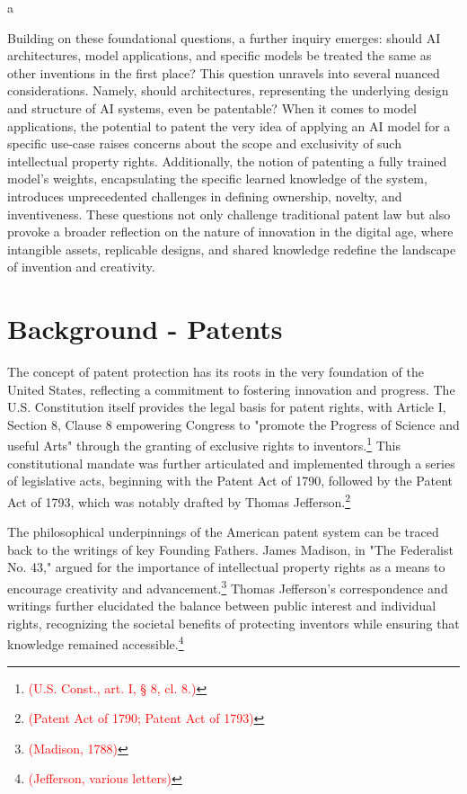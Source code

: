 a\documentclass{article}[10pt]
\begin{document}
Building on these foundational questions, a further inquiry emerges: should AI architectures, model applications, and specific models be treated the same as other inventions in the first place? 
This question unravels into several nuanced considerations. 
Namely, should architectures, representing the underlying design and structure of AI systems, even be patentable? 
When it comes to model applications, the potential to patent the very idea of applying an AI model for a specific use-case raises concerns about the scope and exclusivity of such intellectual property rights. 
Additionally, the notion of patenting a fully trained model's weights, encapsulating the specific learned knowledge of the system, introduces unprecedented challenges in defining ownership, novelty, and inventiveness. 
These questions not only challenge traditional patent law but also provoke a broader reflection on the nature of innovation in the digital age, where intangible assets, replicable designs, and shared knowledge redefine the landscape of invention and creativity.

\section{Background - Patents}

The concept of patent protection has its roots in the very foundation of the United States, reflecting a commitment to fostering innovation and progress. 
The U.S. Constitution itself provides the legal basis for patent rights, with Article I, Section 8, Clause 8 empowering Congress to "promote the Progress of Science and useful Arts" through the granting of exclusive rights to inventors.\footnote{
    \textcolor{red}{(U.S. Const., art. I, § 8, cl. 8.)}} 
This constitutional mandate was further articulated and implemented through a series of legislative acts, beginning with the Patent Act of 1790, followed by the Patent Act of 1793, which was notably drafted by Thomas Jefferson.\footnote{
    \textcolor{red}{(Patent Act of 1790; Patent Act of 1793)}}\par

The philosophical underpinnings of the American patent system can be traced back to the writings of key Founding Fathers. 
James Madison, in "The Federalist No. 43," argued for the importance of intellectual property rights as a means to encourage creativity and advancement.\footnote{
    \textcolor{red}{(Madison, 1788)}} 
Thomas Jefferson's correspondence and writings further elucidated the balance between public interest and individual rights, recognizing the societal benefits of protecting inventors while ensuring that knowledge remained accessible.\footnote{
    \textcolor{red}{(Jefferson, various letters)}}\par
\end{document}
